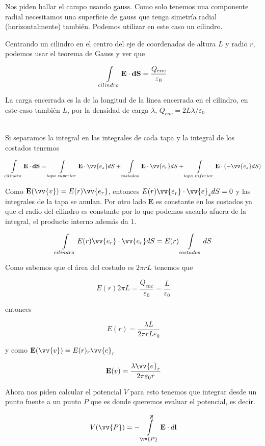 \documentclass[leqno, 12pt, twoside, letterpaper]{book}
\def\efield{\textbf{E}}
\def\vdiff{\textbf{dS}}
\def\lineInt#1#2#3{\int\displaylimits_{#2}^{#3} #1 \cdot d\textbf{l}}
\begin{document}

Nos piden hallar el campo usando gauss. Como solo tenemos una componente radial necesitamos una superficie de gauss que tenga simetría radial (horizontalmente) también. Podemos utilizar en este caso un cilindro.

Centrando un cilindro en el centro del eje de coordenadas de altura $L$ y radio $r$, podemos usar el teorema de Gauss y ver que 

\[ \int\displaylimits_{cilindro} \efield \cdot \vdiff = \dfrac{Q_{enc}}{\varepsilon_0}  \]

La carga encerrada es la de la longitud de la linea encerrada en el cilindro, en este caso también $L$, por la densidad de carga $\lambda$, $Q_{enc} = 2L\lambda/\varepsilon_0$

\hfill\\
\noindent Si separamos la integral en las integrales de cada tapa y la integral de los costados tenemos

\[ \int\displaylimits_{cilindro} \efield \cdot \vdiff = \int\displaylimits_{tapa\,\, superior} \efield \cdot \vv{e_z}dS  + \int\displaylimits_{costados} \efield \cdot \vv{e_r}dS  + \int\displaylimits_{tapa\,\, inferior} \efield \cdot (-\vv{e_z}dS )\]

Como $\efield(\vv{v}) = E(r) \vv{e_r} $, entonces $E(r) \vv{e_r}  \cdot \vv{e}_z dS = 0$ y las integrales de la tapa se anulan. Por otro lado $\efield$ es constante en los costados ya que el radio del cilindro es constante por lo que podemos sacarlo afuera de la integral, el producto interno además da $1$.

\[ \int\displaylimits_{cilindro} E(r) \vv{e_r} \cdot \vv{e_r}dS =   E(r)  \int\displaylimits_{costados}dS \]

Como sabemos que el área del costado es $2\pi r L$ tenemos que

\[ E(r) 2\pi  L = \dfrac{Q_{enc}}{\varepsilon_0} = \dfrac{L}{\varepsilon_0} \]

entonces

\[ E(r) = \dfrac{\lambda L}{2\pi r L \varepsilon_0}\]

y como $\efield(\vv{v}) = E(r)_r \vv{e}_r$

\[ \efield(v) = \dfrac{\lambda \vv{e}_r}{2\pi  \varepsilon_0r} \]


Ahora nos piden calcular el potencial $V$ para esto tenemos que integrar desde un punto fuente a un punto $P$ que es donde queremos evaluar el potencial, es decir.

\[ V(\vv{P}) = -\lineInt{\efield}{\vv{P}}{\mathfrak{F}}  \] 
\end{document}

